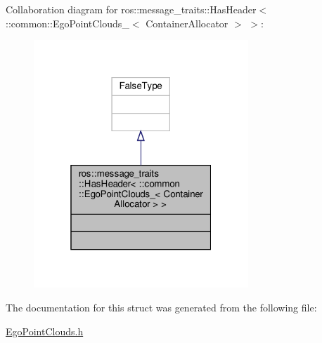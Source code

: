 Collaboration diagram for ros\+:\+:message\+\_\+traits\+:\+:Has\+Header$<$ \+:\+:common\+:\+:Ego\+Point\+Clouds\+\_\+$<$ Container\+Allocator $>$ $>$\+:\nopagebreak
\begin{figure}[H]
\begin{center}
\leavevmode
\includegraphics[width=229pt]{d3/d52/structros_1_1message__traits_1_1HasHeader_3_01_1_1common_1_1EgoPointClouds___3_01ContainerAllocator_01_4_01_4__coll__graph}
\end{center}
\end{figure}


The documentation for this struct was generated from the following file\+:\begin{DoxyCompactItemize}
\item 
\hyperlink{EgoPointClouds_8h}{Ego\+Point\+Clouds.\+h}\end{DoxyCompactItemize}
